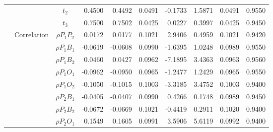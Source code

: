 \documentclass[letterpaper]{article}
\begin{document}
\begin{table}[h]
\begin{tabular}{cccrrrrrrr}
            &             & $t_2$          & 0.4500                 & 0.4492                 & 0.0491                 & -0.1733                & 1.5871                 & 0.0491                   & 0.9550                 \\
            &             & $t_3$          & 0.7500                 & 0.7502                 & 0.0425                 & 0.0227                 & 0.3997                 & 0.0425                   & 0.9450                 \\
            & Correlation & $\rho{P_1P_2}$ & 0.0172                 & 0.0177                 & 0.1021                 & 2.9406                 & 0.4959                 & 0.1021                   & 0.9420                 \\
            &             & $\rho{P_1B_1}$ & -0.0619                & -0.0608                & 0.0990                 & -1.6395                & 1.0248                 & 0.0989                   & 0.9550                 \\
            &             & $\rho{P_1B_2}$ & 0.0460                 & 0.0427                 & 0.0962                 & -7.1895                & 3.4363                 & 0.0963                   & 0.9560                 \\
            &             & $\rho{P_1O_1}$ & -0.0962                & -0.0950                & 0.0965                 & -1.2477                & 1.2429                 & 0.0965                   & 0.9550                 \\
            &             & $\rho{P_1O_2}$ & -0.1050                & -0.1015                & 0.1003                 & -3.3185                & 3.4752                 & 0.1003                   & 0.9400                 \\
            &             & $\rho{P_2B_1}$ & -0.0405                & -0.0407                & 0.0990                 & 0.4266                 & 0.1748                 & 0.0989                   & 0.9450                 \\
            &             & $\rho{P_2B_2}$ & -0.0672                & -0.0669                & 0.1021                 & -0.4419                & 0.2911                 & 0.1020                   & 0.9400                 \\
            &             & $\rho{P_2O_1}$ & 0.1549                 & 0.1605                 & 0.0991                 & 3.5906                 & 5.6119                 & 0.0992                   & 0.9400                 \\

\end{tabular}
\end{table}
\end{document}
